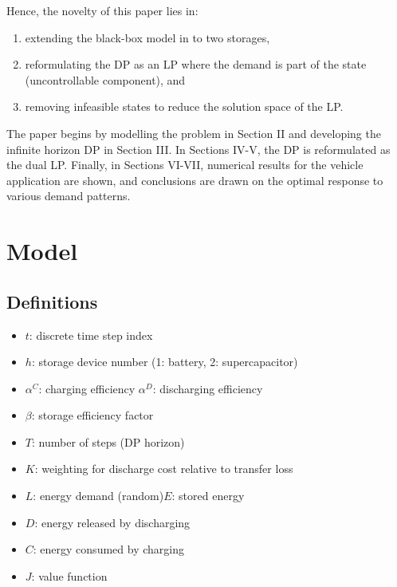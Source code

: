 \documentclass[conference]{IEEEtran}
\begin{document}

Hence, the novelty of this paper lies in:
\begin{enumerate}
    \item extending the black-box model in \cite{su2013modeling} to two storages,
    \item reformulating the DP as an LP where the demand is part of the state (uncontrollable component), and
    \item removing infeasible states to reduce the solution space of the LP.
\end{enumerate} The paper begins by modelling the problem in Section II and developing the infinite horizon DP in Section III. In Sections IV-V, the DP is reformulated as the dual LP. Finally, in Sections VI-VII, numerical results for the vehicle application are shown, and conclusions are drawn on the optimal response to various demand patterns. 



\section{Model}

\subsection{Definitions}
\begin{itemize}
	\item $t$: discrete time step index
	\item $h$: storage device number (1: battery, 2: supercapacitor)
	\item $\alpha^{C}$: charging efficiency\hspace{1em}
	$\alpha^{D}$: discharging efficiency
	\item $\beta$: storage efficiency factor
	\item $T$: number of steps (DP horizon)
	\item $K$: weighting for discharge cost relative to transfer loss
	\item $L$: energy demand (random)\hspace{1em}$E$: stored energy
	\item $D$: energy released by discharging
	\item $C$: energy consumed by charging
	\item $J$: value function
\end{itemize}
\end{document}
